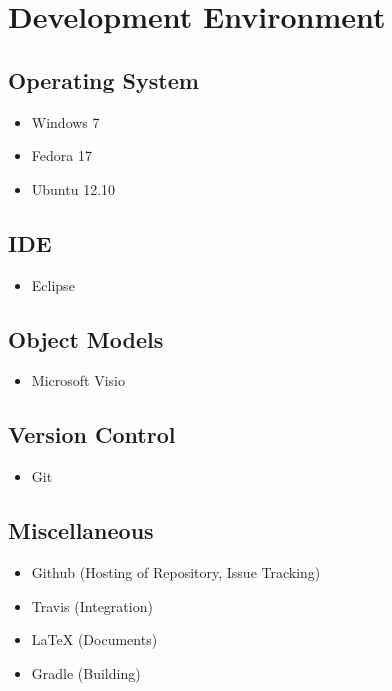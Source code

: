 \section{Development Environment}

\subsection*{Operating System}
\begin{itemize}
\item Windows 7
\item Fedora 17
\item Ubuntu 12.10
\end{itemize}
\subsection*{IDE}
\begin{itemize}
\item Eclipse
\end{itemize}
\subsection*{Object Models}
\begin{itemize}
\item Microsoft Visio
\end{itemize}
\subsection*{Version Control}
\begin{itemize}
\item Git
\end{itemize}
\subsection*{Miscellaneous}
\begin{itemize}
\item Github (Hosting of Repository, Issue Tracking)
\item Travis (Integration)
\item {\LaTeX} (Documents)
\item Gradle (Building) 
\end{itemize}